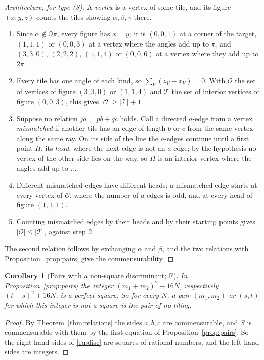 \documentclass[11pt,reqno]{amsart}
\theoremstyle{plain}
\newtheorem{corollary}[theorem]{Corollary}
\theoremstyle{definition}
\newcommand{\Q}{\mathbb{Q}}
\newcommand{\sF}{\textup{\textsf{F}}}
\begin{document}
\begin{proof}[Architecture, for type \textup{(S)}]
A \emph{vertex} is a vertex of some tile, and
its figure $(x,y,z)$ counts the tiles showing $\alpha,\beta,\gamma$ there.
\begin{enumerate}
\item[1.] Since $\alpha\notin\Q\pi$, every figure has $x=y$; it is $(0,0,1)$ at a corner of the target,
$(1,1,1)$ or $(0,0,3)$ at a vertex where the angles add up to $\pi$, and $(3,3,0)$, $(2,2,2)$, $(1,1,4)$ or
$(0,0,6)$ at a vertex where they add up to $2\pi$.
\item[2.] Every tile has one angle of each kind, so $\sum_V(z_V-x_V)=0$. With $\mathcal O$ the set of
vertices of figure $(3,3,0)$ or $(1,1,4)$ and $\mathcal T$ the set of interior vertices of figure $(0,0,3)$,
this gives $|\mathcal O|\ge|\mathcal T|+1$.
\item[3.] Suppose no relation $ja=pb+qc$ holds. Call a directed $a$-edge from a vertex \emph{mismatched} if
another tile has an edge of length $b$ or $c$ from the same vertex along the same ray. On its side of the
line the $a$-edges continue until a first point $H$, its \emph{head}, where the next edge is not an
$a$-edge; by the hypothesis no vertex of the other side lies on the way, so $H$ is an interior vertex where
the angles add up to $\pi$.
\item[4.] Different mismatched edges have different heads; a mismatched edge starts at every vertex of
$\mathcal O$, where the number of $a$-edges is odd, and at every head of figure $(1,1,1)$.
\item[5.] Counting mismatched edges by their heads and by their starting points gives
$|\mathcal O|\le|\mathcal T|$, against step 2.
\end{enumerate}
The second relation follows by exchanging $\alpha$ and $\beta$, and the two relations with
Proposition~\ref{prop:pairs} give the commensurability.
\end{proof}

\begin{corollary}[Pairs with a non-square discriminant; \sF]\label{cor:nonsquare}
In Proposition~\ref{prop:pairs} the integer $(m_1+m_2)^2-16N$, respectively $(t-s)^2+16N$, is a perfect
square. So for every $N$, a pair $(m_1,m_2)$ or $(s,t)$ for which this integer is not a square is the pair of
no tiling.
\end{corollary}

\begin{proof}
By Theorem~\ref{thm:relations} the sides $a,b,c$ are commensurable, and $S$ is commensurable with them by
the first equation of Proposition~\ref{prop:pairs}. So the right-hand sides of \eqref{eq:disc} are squares
of rational numbers, and the left-hand sides are integers.
\end{proof}
\end{document}
